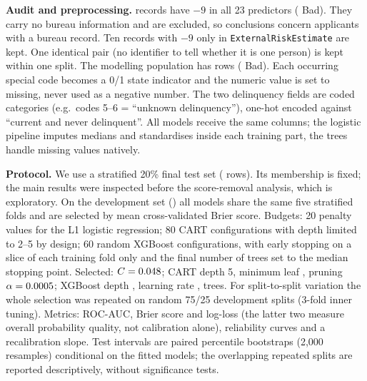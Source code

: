 \documentclass[11pt,a4paper]{article}
\newcommand{\var}[1]{{\small\nolinkurl{#1}}}
\begin{document}
\textbf{Audit and preprocessing.} \NAllNine{} records have $-9$ in all 23 predictors (\AllNineBadRate{} Bad). They carry no bureau information and are excluded, so conclusions concern applicants with a bureau record. Ten records with $-9$ only in \var{ExternalRiskEstimate} are kept. One identical pair (no identifier to tell whether it is one person) is kept within one split. The modelling population has \NPop{} rows (\BadRatePop{} Bad). Each occurring special code becomes a 0/1 state indicator and the numeric value is set to missing, never used as a negative number. The two delinquency fields are coded categories (e.g.\ codes 5--6 = ``unknown delinquency''), one-hot encoded against ``current and never delinquent''. All models receive the same \NCols{} columns; the logistic pipeline imputes medians and standardises inside each training part, the trees handle missing values natively.

\textbf{Protocol.} We use a stratified 20\% final test set (\NTest{} rows). Its membership is fixed; the main results were inspected before the score-removal analysis, which is exploratory. On the development set (\NDev{}) all models share the same five stratified folds and are selected by mean cross-validated Brier score. Budgets: 20 penalty values for the L1 logistic regression; 80 CART configurations with depth limited to 2--5 by design; 60 random XGBoost configurations, with early stopping on a slice of each training fold only and the final number of trees set to the median stopping point. Selected: $C=0.048$; CART depth 5, minimum leaf \CARTminleaf{}, pruning $\alpha=0.0005$; XGBoost depth \XGBdepth{}, learning rate \XGBeta{}, \XGBntrees{} trees. For split-to-split variation the whole selection was repeated on \NRepeats{} random 75/25 development splits (3-fold inner tuning). Metrics: ROC-AUC, Brier score and log-loss (the latter two measure overall probability quality, not calibration alone), reliability curves and a recalibration slope. Test intervals are paired percentile bootstraps (2,000 resamples) conditional on the fitted models; the overlapping repeated splits are reported descriptively, without significance tests.
\end{document}
